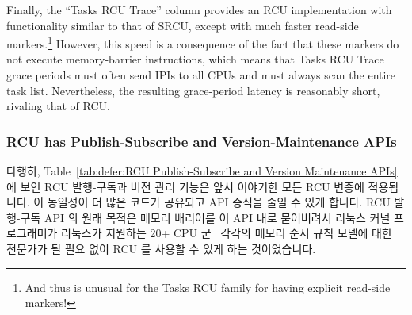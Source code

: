 Finally, the ``Tasks RCU Trace'' column provides an RCU implementation
with functionality similar to that of SRCU, except with much faster
read-side markers.\footnote{
	And thus is unusual for the Tasks RCU family for having
	explicit read-side markers!}
However, this speed is a consequence of the fact that these markers
do not execute memory-barrier instructions, which means that Tasks RCU
Trace grace periods must often send IPIs to all CPUs and must always
scan the entire task list.
Nevertheless, the resulting grace-period latency is reasonably short,
rivaling that of RCU\@.

\fi

\subsubsection{RCU has Publish-Subscribe and Version-Maintenance APIs}
\label{sec:defer:RCU has Publish-Subscribe and Version-Maintenance APIs}

다행히,
Table~\ref{tab:defer:RCU Publish-Subscribe and Version Maintenance APIs}
에 보인 RCU 발행-구독과 버전 관리 기능은 앞서 이야기한 모든 RCU 변종에
적용됩니다.
이 동일성이 더 많은 코드가 공유되고 API 증식을 줄일 수 있게 합니다.
RCU 발행-구독 API 의 원래 목적은 메모리 배리어를 이 API 내로 묻어버려서 리눅스
커널 프로그래머가 리눅스가 지원하는 20+ CPU 군~\cite{Spraul01} 각각의 메모리
순서 규칙 모델에 대한 전문가가 될 필요 없이 RCU 를 사용할 수 있게 하는
것이었습니다.

